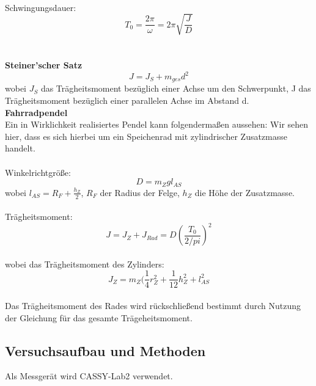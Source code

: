 \documentclass{article}
\begin{document}
\\
Schwingungsdauer:
\begin{equation*}
T_0=\frac{2\pi}{\omega}=2\pi\sqrt{\frac{J}{D}}
\end{equation*}\\
\\
\textbf{Steiner'scher Satz}\\
\begin{equation*}
J = J_S + m_{ges} d^2
\end{equation*}
wobei $J_S$ das Trägheitsmoment bezüglich einer Achse um den Schwerpunkt, J das Trägheitsmoment bezüglich einer parallelen Achse im Abstand d.
\\
\textbf{Fahrradpendel}\\
Ein in Wirklichkeit realisiertes Pendel kann folgendermaßen aussehen:
Wir sehen hier, dass es sich hierbei um ein Speichenrad mit zylindrischer Zusatzmasse handelt.\\
\\
Winkelrichtgröße:
\begin{equation*}
D=m_Z g l_{AS}
\end{equation*}
wobei $l_{AS}=R_F + \frac{h_Z}{2}$, $R_F$ der Radius der Felge, $h_Z$ die Höhe der Zusatzmasse.\\
\\
Trägheitsmoment:
\begin{equation*}
J = J_Z + J_{Rad} = D (\frac{T_0}{2/pi})^2
\end{equation*}
\\
wobei das Trägheitsmoment des Zylinders:
\begin{equation*}
J_Z = m_Z(\frac{1}{4}r^2_Z + \frac{1}{12}h^2_Z+l^2_{AS}
\end{equation*}
\\
Das Trägheitsmoment des Rades wird rückschließend bestimmt durch Nutzung der Gleichung für das gesamte Trägeheitsmoment.

\subsection{Versuchsaufbau und Methoden}
Als Messgerät wird CASSY-Lab2 verwendet.\\
\\
\end{document}
